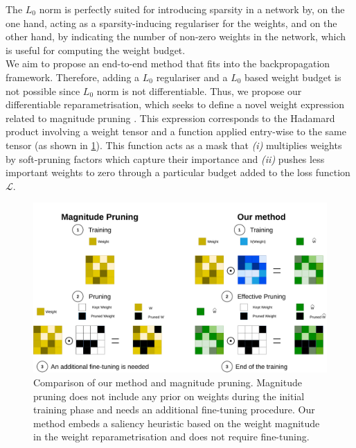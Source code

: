 The $L_0$ norm is perfectly suited for introducing sparsity in a network by, on
the one hand, acting as a sparsity-inducing regulariser for the weights, and on
the other hand, by indicating the number of non-zero weights in the network,
which is useful for computing the weight budget. \\

We aim to propose an end-to-end method that fits into the backpropagation
framework. Therefore, adding a $L_0$ regulariser and a $L_0$ based weight budget
is not possible since $L_0$ norm is not differentiable. Thus, we propose our
differentiable reparametrisation, which seeks to define a novel weight
expression related to magnitude pruning
\cite{DBLP:conf/nips/CunDS89,DBLP:conf/nips/HanPTD15}. This expression
corresponds to the Hadamard product involving a weight tensor and a function
applied entry-wise to the same tensor (as shown in
\cref{fig:chap1:comparison_reparam_vs_mag_pruning}). This function acts as a
mask that \emph{(i)} multiplies weights by soft-pruning factors which capture their
importance and \emph{(ii)} pushes less important weights to zero through a particular
budget added to the loss function $\mathcal{L}$. \\

\begin{figure}[ht]
    \centerline{\includegraphics[width=12.5cm]{chapter_1/assets/comparison_reparam_vs_mag_pruning.pdf}}
  \caption{Comparison of our method and magnitude pruning. Magnitude pruning
  does not include any prior on weights during the initial training phase
  and needs an additional fine-tuning procedure. Our method embeds a saliency
  heuristic based on the weight magnitude in the weight reparametrisation and
  does not require fine-tuning.}
  \label{fig:chap1:comparison_reparam_vs_mag_pruning}
\end{figure}


